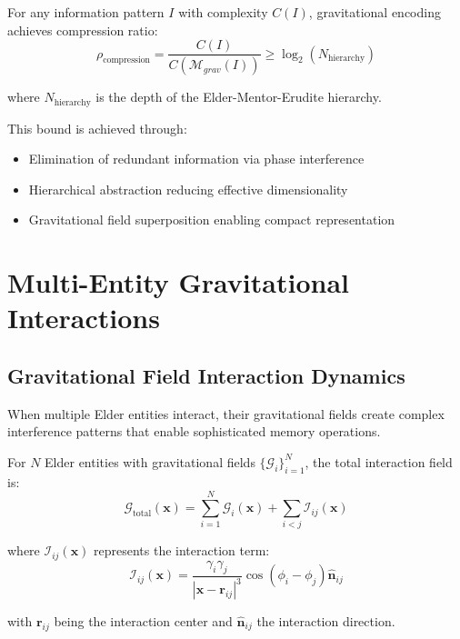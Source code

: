 \begin{theorem}
\label{thm:gravitational_compression}
For any information pattern $I$ with complexity $C(I)$, gravitational encoding achieves compression ratio:
\begin{equation}
\rho_{\text{compression}} = \frac{C(I)}{C(\mathcal{M}_{grav}(I))} \geq \log_2(N_{\text{hierarchy}})
\end{equation}

where $N_{\text{hierarchy}}$ is the depth of the Elder-Mentor-Erudite hierarchy.

This bound is achieved through:
\begin{itemize}
    \item Elimination of redundant information via phase interference
    \item Hierarchical abstraction reducing effective dimensionality
    \item Gravitational field superposition enabling compact representation
\end{itemize}
\end{theorem}

\section{Multi-Entity Gravitational Interactions}

\subsection{Gravitational Field Interaction Dynamics}

When multiple Elder entities interact, their gravitational fields create complex interference patterns that enable sophisticated memory operations.

\begin{definition}
\label{def:multi_entity_interaction}
For $N$ Elder entities with gravitational fields $\{\mathcal{G}_i\}_{i=1}^N$, the total interaction field is:
\begin{equation}
\mathcal{G}_{\text{total}}(\mathbf{x}) = \sum_{i=1}^N \mathcal{G}_i(\mathbf{x}) + \sum_{i<j} \mathcal{I}_{ij}(\mathbf{x})
\end{equation}

where $\mathcal{I}_{ij}(\mathbf{x})$ represents the interaction term:
\begin{equation}
\mathcal{I}_{ij}(\mathbf{x}) = \frac{\gamma_i \gamma_j}{|\mathbf{x} - \mathbf{r}_{ij}|^3} \cos(\phi_i - \phi_j) \hat{\mathbf{n}}_{ij}
\end{equation}

with $\mathbf{r}_{ij}$ being the interaction center and $\hat{\mathbf{n}}_{ij}$ the interaction direction.
\end{definition}

